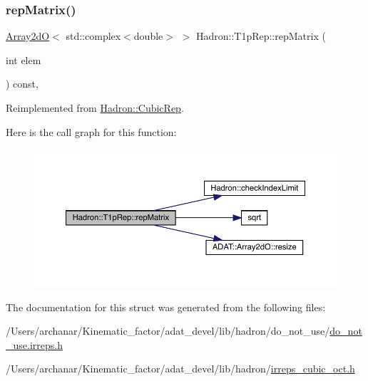 \subsubsection{\texorpdfstring{repMatrix()}{repMatrix()}\hspace{0.1cm}{\footnotesize\ttfamily [2/2]}}
{\footnotesize\ttfamily \mbox{\hyperlink{classADAT_1_1Array2dO}{Array2dO}}$<$ std\+::complex$<$double$>$ $>$ Hadron\+::\+T1p\+Rep\+::rep\+Matrix (\begin{DoxyParamCaption}\item[{int}]{elem }\end{DoxyParamCaption}) const\hspace{0.3cm}{\ttfamily [inline]}, {\ttfamily [virtual]}}



Reimplemented from \mbox{\hyperlink{structHadron_1_1CubicRep_ac5d7e9e6f4ab1158b5fce3e4ad9e8005}{Hadron\+::\+Cubic\+Rep}}.

Here is the call graph for this function\+:
\nopagebreak
\begin{figure}[H]
\begin{center}
\leavevmode
\includegraphics[width=350pt]{df/dba/structHadron_1_1T1pRep_ad013f454206c3e9f9b7c78db7812df97_cgraph}
\end{center}
\end{figure}


The documentation for this struct was generated from the following files\+:\begin{DoxyCompactItemize}
\item 
/\+Users/archanar/\+Kinematic\+\_\+factor/adat\+\_\+devel/lib/hadron/do\+\_\+not\+\_\+use/\mbox{\hyperlink{do__not__use_8irreps_8h}{do\+\_\+not\+\_\+use.\+irreps.\+h}}\item 
/\+Users/archanar/\+Kinematic\+\_\+factor/adat\+\_\+devel/lib/hadron/\mbox{\hyperlink{lib_2hadron_2irreps__cubic__oct_8h}{irreps\+\_\+cubic\+\_\+oct.\+h}}\end{DoxyCompactItemize}
